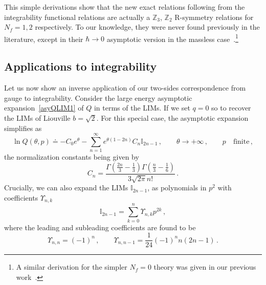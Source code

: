 \documentclass[11pt,a4paper]{elsarticle}
\def \th {\theta}
\newcommand{\be}{\begin{equation}}
\newcommand{\ee}{\end{equation}}
\def\th{\theta}
\numberwithin{figure}{section}
\numberwithin{table}{section}
\begin{document}
This simple derivations show that the new exact relations following from the integrability functional relations are actually a $\mathbb{Z}_3$, $\mathbb{Z}_2$ R-symmetry relations for $N_f=1,2$ respectively. To our knowledge, they were never found previously in the literature, except in their $\hbar \to 0$ asymptotic version in the massless case~\cite{BilalFerrariQCD:1996}.\footnote{A similar derivation for the simpler $N_f=0$ theory was given in our previous work~\cite{FioravantiGregori:2019}.}



\subsection{Applications to integrability}


Let us now show an inverse application of our two-sides correspondence from gauge to integrability.  %
 Consider the large energy asymptotic expansion~\eqref{asyQLIM1} of $Q$ in terms of the LIMs. If we set $q=0$ so to recover the LIMs of Liouville $b = \sqrt{2}$. For this special case, the asymptotic expansion simplifies as
\be 
\ln Q (\th,p) \doteq- C_0 e^\th - \sum_{n=1}^\infty e^{\th(1-2n)}C_n \mathbb{I}_{2n-1}\,,\qquad \th \to +\infty \,,\qquad p \quad \text{finite}\,,
\ee 
the normalization constants being given by %
\be 
C_n=\frac{\Gamma \left(\frac{2 n}{3}-\frac{1}{3}\right)\Gamma \left(\frac{n}{3}-\frac{1}{6}\right) }{3 \sqrt{2 \pi } n!}\,.
\ee 
Crucially, we can also expand the LIMs $\mathbb{I}_{2n-1}$, as polynomials in $p^2$ with coefficients $\Upsilon_{n,k}$
\be 
\mathbb{I}_{2n-1} = \sum_{k=0}^n \Upsilon_{n,k} p^{2k }\,,
\ee 
where the leading and subleading coefficients are found to be~\cite{FioravantiGregori:2019}
\be \label{Upsnm}
\Upsilon_{n,n} = (-1)^n\,, \qquad \Upsilon_{n,n-1} =\frac{1}{24} (-1)^n n (2 n-1)\,.
\ee
\end{document}
